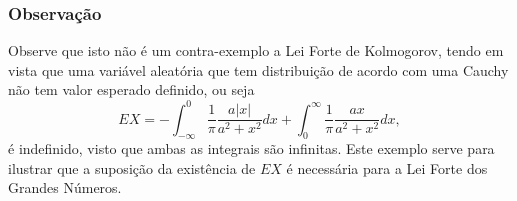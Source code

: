 \begin{frame}
\frametitle{\textbf{Observação}}
\baselineskip=13pt
\begin{block}{}



Observe que isto não é um contra-exemplo a Lei Forte de Kolmogorov,
tendo em vista que uma variável aleatória que tem distribuição de
acordo com uma Cauchy não tem valor esperado definido, ou seja
$$EX=-\int_{-\infty}^{0}\frac{1}{\pi}\frac{a|x|}{a^2+x^2}dx+\int_{0}^{\infty}\frac{1}{\pi}\frac{ax}{a^2+x^2}dx,$$
é indefinido, visto que ambas as integrais são infinitas. Este
exemplo serve para ilustrar que a suposição da existência de $EX$ é
necessária para a Lei Forte dos Grandes Números.

\end{block}
\end{frame}




